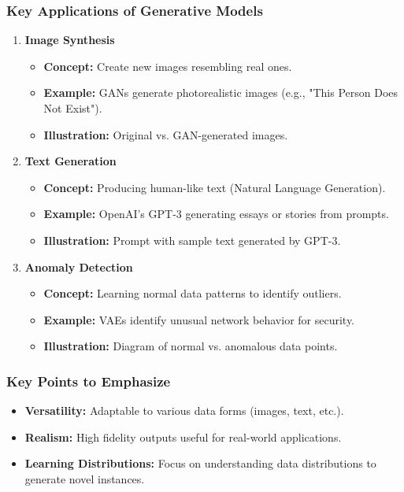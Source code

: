 \documentclass[aspectratio=169]{beamer}
\begin{document}
\begin{frame}[fragile]
    \frametitle{Key Applications of Generative Models}
    \begin{enumerate}
        \item \textbf{Image Synthesis}
        \begin{itemize}
            \item \textbf{Concept:} Create new images resembling real ones.
            \item \textbf{Example:} GANs generate photorealistic images (e.g., "This Person Does Not Exist").
            \item \textbf{Illustration:} Original vs. GAN-generated images.
        \end{itemize}

        \item \textbf{Text Generation}
        \begin{itemize}
            \item \textbf{Concept:} Producing human-like text (Natural Language Generation).
            \item \textbf{Example:} OpenAI's GPT-3 generating essays or stories from prompts.
            \item \textbf{Illustration:} Prompt with sample text generated by GPT-3.
        \end{itemize}

        \item \textbf{Anomaly Detection}
        \begin{itemize}
            \item \textbf{Concept:} Learning normal data patterns to identify outliers.
            \item \textbf{Example:} VAEs identify unusual network behavior for security.
            \item \textbf{Illustration:} Diagram of normal vs. anomalous data points.
        \end{itemize}
    \end{enumerate}
\end{frame}

\begin{frame}[fragile]
    \frametitle{Key Points to Emphasize}
    \begin{itemize}
        \item \textbf{Versatility:} Adaptable to various data forms (images, text, etc.).
        \item \textbf{Realism:} High fidelity outputs useful for real-world applications.
        \item \textbf{Learning Distributions:} Focus on understanding data distributions to generate novel instances.
    \end{itemize}
\end{frame}
\end{document}

